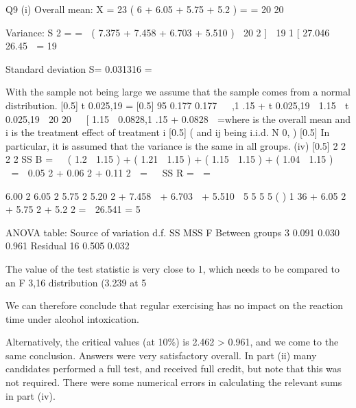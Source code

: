 \documentclass[a4paper,12pt]{article}
\begin{document}
Q9
(i)
Overall mean: X \;=
23
( 6 + 6.05 + 5.75 + 5.2 ) \;=\; \;=
20
20

Variance:
S 2 \;=\;
\;= 
( 7.375 + 7.458 + 6.703 + 5.510 )  20  2 \right]

19
1
[ 27.046  26.45  \;=
19

Standard deviation
S= 0.031316 \;=

With the sample not being large we assume that the sample comes from a
normal distribution.
[0.5]
t 0.025,19 \;=
[0.5]
95%
0.177
0.177 

,1 .15 + t 0.025,19
 1.15  t 0.025,19

20
20 

[ 1.15  0.0828,1 .15 + 0.0828  \;=\; [ 1.067, 1 .233 
Page 8
Subject CT3 %
(ii) The confidence interval in part (i) does not contain 0.9. Therefore, there is a
significant difference between the reaction time under alcohol intoxication and
0.9.

(iii) Y ij \;=\; \mu + \tau i + \varepsilon ij
[0.5]
where \mu is the overall mean and \tau i is the treatment effect of treatment i [0.5]
(
and \varepsilon ij being i.i.d. N 0, 
)
[0.5]
In particular, it is assumed that the variance is the same in all groups.
(iv)
[0.5]
2
2
2
2
SS B \;= \times   ( 1.2  1.15 ) + ( 1.21  1.15 ) + ( 1.15  1.15 ) + ( 1.04  1.15 )  


\;= \times  0.05 2 + 0.06 2 + 0.11 2  \;=


SS R \;= 
\;= 

6.00 2
6.05 2
5.75 2
5.20 2
+ 7.458 
+ 6.703 
+ 5.510 
5
5
5
5
(
)
1
36 + 6.05 2 + 5.75 2 + 5.2 2 \;=  26.541 \;=
5

ANOVA table:
Source of variation d.f. SS
MSS F
Between groups
3
0.091 0.030 0.961
Residual
16 0.505 0.032

The value of the test statistic is very close to 1, which needs to be compared to
an F 3,16 distribution (3.239 at 5%

We can therefore conclude that regular exercising has no impact on the reaction time under alcohol intoxication.

Alternatively, the critical values (at 10\%) is 2.462 > 0.961, and we come to the same conclusion.
Answers were very satisfactory overall. In part (ii) many candidates performed a full test, and received full credit, but note that this was not required. There were some numerical errors in calculating the
relevant sums in part (iv).
\end{document}
